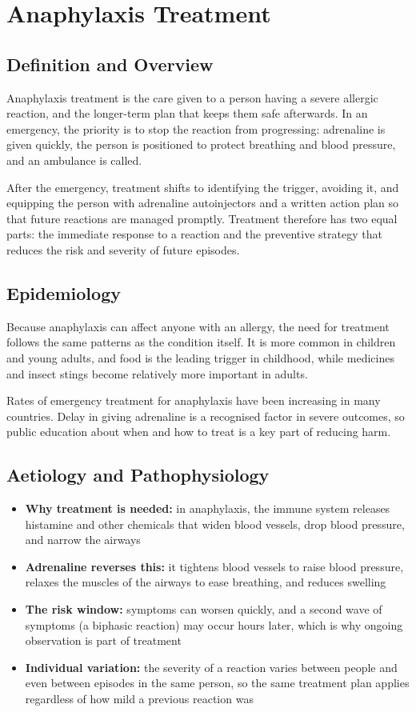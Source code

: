 \chapter{Anaphylaxis Treatment}

\section*{Definition and Overview}
Anaphylaxis treatment is the care given to a person having a severe allergic reaction, and the longer-term plan that keeps them safe afterwards. In an emergency, the priority is to stop the reaction from progressing: adrenaline is given quickly, the person is positioned to protect breathing and blood pressure, and an ambulance is called.

After the emergency, treatment shifts to identifying the trigger, avoiding it, and equipping the person with adrenaline autoinjectors and a written action plan so that future reactions are managed promptly. Treatment therefore has two equal parts: the immediate response to a reaction and the preventive strategy that reduces the risk and severity of future episodes.

\section*{Epidemiology}
Because anaphylaxis can affect anyone with an allergy, the need for treatment follows the same patterns as the condition itself. It is more common in children and young adults, and food is the leading trigger in childhood, while medicines and insect stings become relatively more important in adults.

Rates of emergency treatment for anaphylaxis have been increasing in many countries. Delay in giving adrenaline is a recognised factor in severe outcomes, so public education about when and how to treat is a key part of reducing harm.

\section*{Aetiology and Pathophysiology}
\begin{itemize}
    \item \textbf{Why treatment is needed:} in anaphylaxis, the immune system releases histamine and other chemicals that widen blood vessels, drop blood pressure, and narrow the airways
    \item \textbf{Adrenaline reverses this:} it tightens blood vessels to raise blood pressure, relaxes the muscles of the airways to ease breathing, and reduces swelling
    \item \textbf{The risk window:} symptoms can worsen quickly, and a second wave of symptoms (a biphasic reaction) may occur hours later, which is why ongoing observation is part of treatment
    \item \textbf{Individual variation:} the severity of a reaction varies between people and even between episodes in the same person, so the same treatment plan applies regardless of how mild a previous reaction was
\end{itemize}

